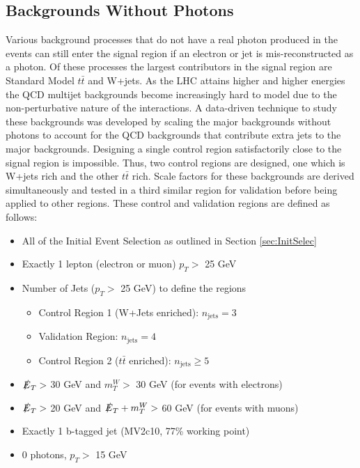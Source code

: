\subsection{Backgrounds Without Photons}
\label{sec:BKGnoPho}
Various background processes that do not have a real photon produced in the events can still enter the signal region if an electron or jet is mis-reconstructed as a photon.  Of these processes the largest contributors in the signal region are Standard Model $t\bar{t}$ and W+jets.  As the LHC attains higher and higher energies the QCD multijet backgrounds become increasingly hard to model due to the non-perturbative nature of the interactions.  A data-driven technique to study these backgrounds was developed by scaling the major backgrounds without photons to account for the QCD backgrounds that contribute extra jets to the major backgrounds.  Designing a single control region satisfactorily close to the signal region is impossible.  Thus, two control regions are designed, one which is W+jets rich and the other $t\bar{t}$ rich.  Scale factors for these backgrounds are derived simultaneously and tested in a third similar region for validation before being applied to other regions.  
These control and validation regions are defined as follows:
\begin{itemize}
\item All of the Initial Event Selection as outlined in Section \ref{sec:InitSelec}
\item Exactly 1 lepton (electron or muon) $p_T >$ 25 GeV
\item Number of Jets  ($p_T >$ 25 GeV) to define the regions
	\begin{itemize}
	\item Control Region 1 (W+Jets enriched): $n_{\text{jets}} = 3$
	\item Validation Region: $n_{\text{jets}} =4$
	\item Control Region 2 ($t\bar{t}$ enriched): $n_{\text{jets}} \geq 5$
	\end{itemize}
\item $\slashed{E}_T >$ 30 GeV and $m_T^W >$ 30 GeV (for events with electrons)
\item $\slashed{E}_T >$ 20 GeV and $\slashed{E}_T + m_T^W >$ 60 GeV (for events with muons)
\item Exactly 1 b-tagged jet (MV2c10, 77\% working point)
\item 0 photons, $p_T >$ 15 GeV
\end{itemize}

